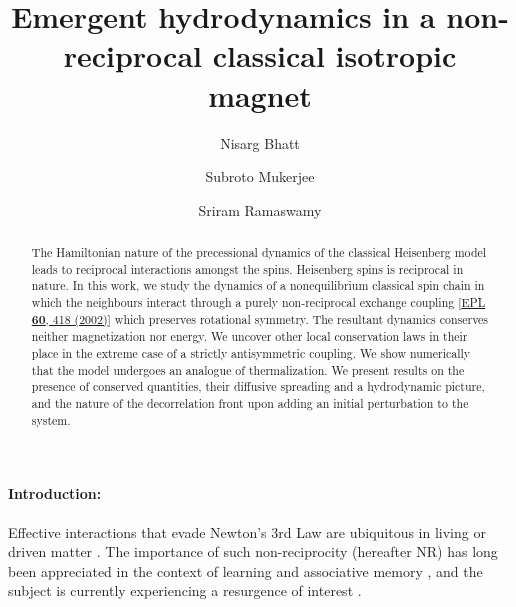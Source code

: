 \documentclass[prl,aps,twocolumn,nosuperscriptaddress,bibnotes,notitlepage,nofootinbib]{revtex4-2}
\begin{document}
\title{Emergent hydrodynamics in a non-reciprocal classical isotropic magnet}

\author{Nisarg Bhatt}
\author{Subroto Mukerjee}
\author{Sriram Ramaswamy}

\begin{abstract}
The Hamiltonian nature of the precessional dynamics of the classical Heisenberg model leads to reciprocal interactions amongst the spins. Heisenberg spins is reciprocal in nature. 
In this work, we study the dynamics of a nonequilibrium classical 
spin chain in which 
the neighbours interact through a purely non-reciprocal exchange coupling [\href{https://iopscience.iop.org/article/10.1209/epl/i2002-00280-2}{EPL \textbf{60}, 418 (2002)}] which preserves rotational symmetry. The resultant dynamics conserves neither magnetization nor energy. We uncover other local conservation laws in their place in the extreme case of a strictly antisymmetric coupling. We show
numerically that the model undergoes an analogue of thermalization. We present results on the presence of conserved quantities, their diffusive spreading and a hydrodynamic picture, and the nature of the decorrelation front upon adding an initial perturbation to the system.

\end{abstract}
\maketitle

\paragraph{Introduction:} Effective interactions that evade Newton's 3rd Law are ubiquitous in living or driven matter \cite{das2002driven,ivlev2015statistical,dadhichi2020nonmutual,SSaha_etalPRX2020,you2020nonreciprocity,CahnHilliardnonvarcoupling2021,PhysRevLett.104.178103}.
The importance of such non-reciprocity (hereafter NR) has long been appreciated in the context of learning and associative memory \cite{parisi1986asymmetric, PhysRevE.86.011909}, and the subject is currently experiencing a resurgence of interest \cite{fruchart2021non, bowick2022symmetry, shamikgupta2019}.
\end{document}
